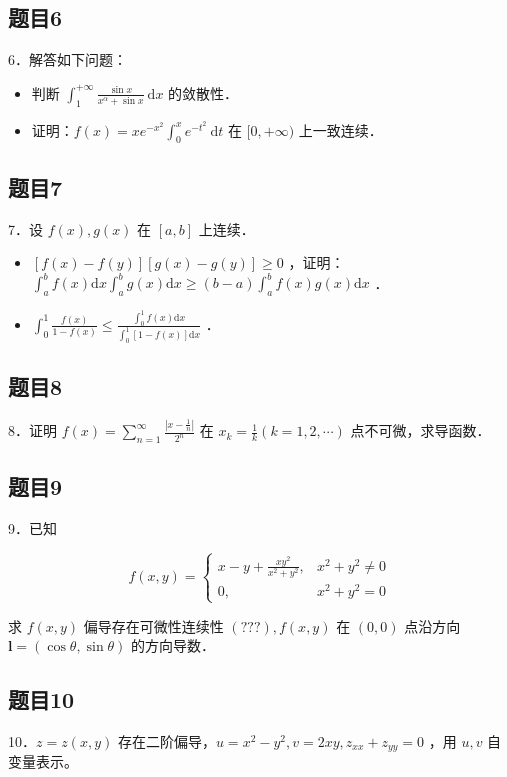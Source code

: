 \documentclass{article}
\begin{document}
\subsection{题目6}
6．解答如下问题：

\begin{itemize}
  \item[（1）] 判断 \(\int_{1}^{+\infty} \frac{\sin x}{x^{\alpha}+\sin x} \mathrm{~d} x\) 的敛散性．
  \item[（2）] 证明：\(f(x)=x e^{-x^{2}} \int_{0}^{x} e^{-t^{2}} \mathrm{~d} t\) 在 \([0,+\infty)\) 上一致连续．
\end{itemize}

\subsection{题目7}
7．设 \(f(x), g(x)\) 在 \([a, b]\) 上连续．

\begin{itemize}
  \item[（1）] \([f(x)-f(y)][g(x)-g(y)] \geq 0\) ，证明： \(\int_{a}^{b} f(x) \mathrm{d} x \int_{a}^{b} g(x) \mathrm{d} x \geq(b-a) \int_{a}^{b} f(x) g(x) \mathrm{d} x\) ．
  \item[（2）] \(\int_{0}^{1} \frac{f(x)}{1-f(x)} \leq \frac{\int_{0}^{1} f(x) \mathrm{d} x}{\int_{0}^{1}[1-f(x)] \mathrm{d} x}\) ．
\end{itemize}

\subsection{题目8}
8．证明 \(f(x)=\sum_{n=1}^{\infty} \frac{\left|x-\frac{1}{n}\right|}{2^{n}}\) 在 \(x_{k}=\frac{1}{k}(k=1,2, \cdots)\) 点不可微，求导函数．

\subsection{题目9}
9．已知

\[
f(x, y)= \begin{cases}x-y+\frac{x y^{2}}{x^{2}+y^{2}}, & x^{2}+y^{2} \neq 0 \\ 0, & x^{2}+y^{2}=0\end{cases}
\]

求 \(f(x, y)\) 偏导存在可微性连续性 \((? ? ?), f(x, y)\) 在 \((0,0)\) 点沿方向 \(\mathbf{l}=(\cos \theta, \sin \theta)\) 的方向导数．

\subsection{题目10}
10．\(z=z(x, y)\) 存在二阶偏导，\(u=x^{2}-y^{2}, v=2 x y, z_{x x}+z_{y y}=0\) ，用 \(u, v\) 自变量表示。
\end{document}
